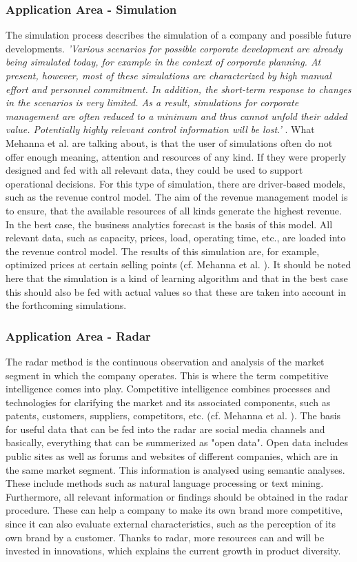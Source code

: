 \documentclass[12pt,twocolumn,twoside]{conference}   %
\begin{document}
\subsubsection{Application Area - Simulation}
The simulation process describes the simulation of a company and possible future developments. \textit{'Various scenarios for possible corporate development are already being simulated today, for example in the context of corporate planning. At present, however, most of these simulations are characterized by high manual effort and personnel commitment. In addition, the short-term response to changes in the scenarios is very limited. As a result, simulations for corporate management are often reduced to a minimum and thus cannot unfold their added value. Potentially highly relevant control information will be lost.'} \cite{2}. What Mehanna et al. are talking about, is that the user of simulations often do not offer enough meaning, attention and resources of any kind. If they were properly designed and fed with all relevant data, they could be used to support operational decisions. For this type of simulation, there are driver-based models, such as the revenue control model. The aim of the revenue management model is to ensure, that the available resources of all kinds generate the highest revenue. In the best case, the business analytics forecast is the basis of this model. All relevant data, such as capacity, prices, load, operating time, etc., are loaded into the revenue control model. The results of this simulation are, for example, optimized prices at certain selling points (cf. Mehanna et al. \cite{2}). It should be noted here that the simulation is a kind of learning algorithm and that in the best case this should also be fed with actual values so that these are taken into account in the forthcoming simulations. 


\subsubsection{Application Area - Radar}
The radar method is the continuous observation and analysis of the market segment in which the company operates. This is where the term competitive intelligence comes into play. Competitive intelligence combines processes and technologies for clarifying the market and its associated components, such as patents, customers, suppliers, competitors, etc. (cf. Mehanna et al. \cite{2}). The basis for useful data that can be fed into the radar are social media channels and basically, everything that can be summerized as "open data". Open data includes public sites as well as forums and websites of different companies, which are in the same market segment. This information is analysed using semantic analyses. These include methods such as natural language processing or text mining. Furthermore, all relevant information or findings should be obtained in the radar procedure. These can help a company to make its own brand more competitive, since it can also evaluate external characteristics, such as the perception of its own brand by a customer. Thanks to radar, more resources can and will be invested in innovations, which explains the current growth in product diversity.
\end{document}
